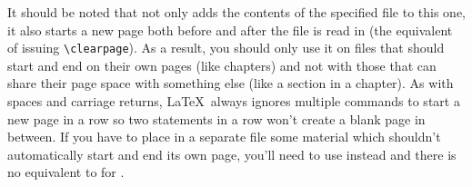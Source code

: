 It should be noted that \verb== not only adds the contents of the specified file to this one, it also starts a new page both before and after the file is read in (the equivalent of issuing \verb=\clearpage=).  As a result, you should only use it on files that should start and end on their own pages (like chapters) and not with those that can share their page space with something else (like a section in a chapter).  As with spaces and carriage returns, \LaTeX\ always ignores multiple commands to start a new page in a row so two \verb== statements in a row won't create a blank page in between.  If you have to place in a separate file some material which shouldn't automatically start and end its own page, you'll need to use \verb== instead and there is no equivalent to \verb== for \verb==.

\endinput